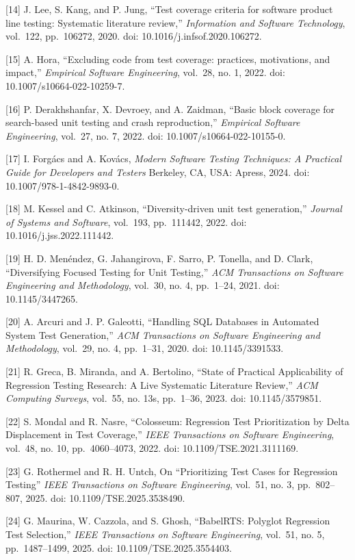 \documentclass[
  12pt,
]{report}
\begin{document}
{[}14{]} J. Lee, S. Kang, and P. Jung, ``Test coverage criteria for
software product line testing: Systematic literature review,''
\emph{Information and Software Technology}, vol.~122, pp.~106272, 2020.
doi: 10.1016/j.infsof.2020.106272.

{[}15{]} A. Hora, ``Excluding code from test coverage: practices,
motivations, and impact,'' \emph{Empirical Software Engineering},
vol.~28, no. 1, 2022. doi: 10.1007/s10664-022-10259-7.

{[}16{]} P. Derakhshanfar, X. Devroey, and A. Zaidman, ``Basic block
coverage for search-based unit testing and crash reproduction,''
\emph{Empirical Software Engineering}, vol.~27, no. 7, 2022. doi:
10.1007/s10664-022-10155-0.

{[}17{]} I. Forgács and A. Kovács, \emph{Modern Software Testing
Techniques: A Practical Guide for Developers and Testers} Berkeley, CA,
USA: Apress, 2024. doi: 10.1007/978-1-4842-9893-0.

{[}18{]} M. Kessel and C. Atkinson, ``Diversity-driven unit test
generation,'' \emph{Journal of Systems and Software}, vol.~193,
pp.~111442, 2022. doi: 10.1016/j.jss.2022.111442.

{[}19{]} H. D. Menéndez, G. Jahangirova, F. Sarro, P. Tonella, and D.
Clark, ``Diversifying Focused Testing for Unit Testing,'' \emph{ACM
Transactions on Software Engineering and Methodology}, vol.~30, no. 4,
pp.~1--24, 2021. doi: 10.1145/3447265.

{[}20{]} A. Arcuri and J. P. Galeotti, ``Handling SQL Databases in
Automated System Test Generation,'' \emph{ACM Transactions on Software
Engineering and Methodology}, vol.~29, no. 4, pp.~1--31, 2020. doi:
10.1145/3391533.

{[}21{]} R. Greca, B. Miranda, and A. Bertolino, ``State of Practical
Applicability of Regression Testing Research: A Live Systematic
Literature Review,'' \emph{ACM Computing Surveys}, vol.~55, no. 13s,
pp.~1--36, 2023. doi: 10.1145/3579851.

{[}22{]} S. Mondal and R. Nasre, ``Colosseum: Regression Test
Prioritization by Delta Displacement in Test Coverage,'' \emph{IEEE
Transactions on Software Engineering}, vol.~48, no. 10, pp.~4060--4073,
2022. doi: 10.1109/TSE.2021.3111169.

{[}23{]} G. Rothermel and R. H. Untch, On ``Prioritizing Test Cases for
Regression Testing'' \emph{IEEE Transactions on Software Engineering},
vol.~51, no. 3, pp.~802--807, 2025. doi: 10.1109/TSE.2025.3538490.

{[}24{]} G. Maurina, W. Cazzola, and S. Ghosh, ``BabelRTS: Polyglot
Regression Test Selection,'' \emph{IEEE Transactions on Software
Engineering}, vol.~51, no. 5, pp.~1487--1499, 2025. doi:
10.1109/TSE.2025.3554403.
\end{document}
